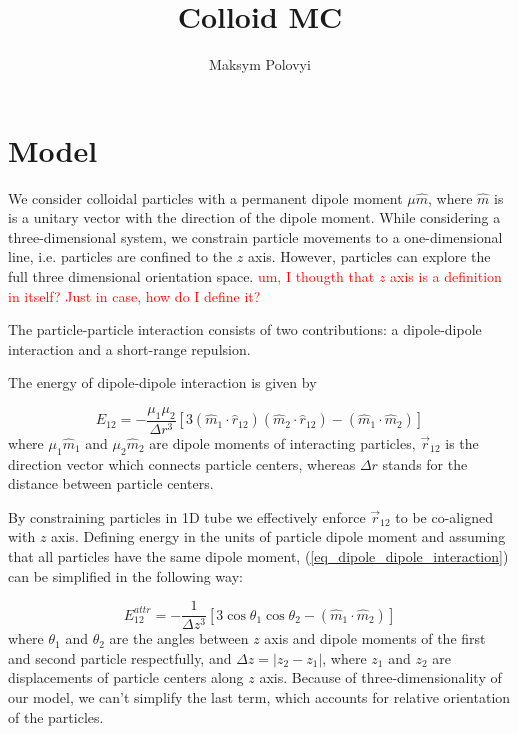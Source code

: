 \documentclass[12pt,a4paper]{article}
\author{Maksym Polovyi}
\title{Colloid MC}
\begin{document}
\section{Model}

We consider colloidal particles with a permanent dipole moment $\mu \hat{m}$, where $\hat{m}$ is is a unitary vector with the direction of the dipole moment. While considering a three-dimensional system, we constrain particle movements to a one-dimensional line, i.e. particles are confined to the $z$ axis. However, particles can explore the full three dimensional orientation space. \textcolor{red}{um, I thougth that $z$ axis is a definition in itself? Just in case, how do I define it?}

The particle-particle interaction consists of two contributions: a dipole-dipole interaction and a short-range repulsion.

The energy of dipole-dipole interaction is given by

\label{eq_dipole_dipole_interaction}
\begin{equation}
E_{12} = - \frac{\mu_1 \mu_2}{\Delta r^3}[3 (\hat{m}_1 \cdot \hat{r}_{12})(\hat{m}_2 \cdot \hat{r}_{12}) - (\hat{m}_1 \cdot \hat{m}_2)]
\end{equation}
where $\mu_1 \hat{m}_1$ and $\mu_2 \hat{m}_2$ are dipole moments of interacting particles, $\vec{r}_{12}$ is the direction vector which connects particle centers, whereas $\Delta r$ stands for the distance between particle centers.

By constraining particles in 1D tube we effectively enforce $\vec{r}_{12}$ to be co-aligned with $z$ axis. Defining energy in the units of particle dipole moment and assuming that all particles have the same dipole moment, (\ref{eq_dipole_dipole_interaction}) can be simplified in the following way:

\label{eq_dipole_dipole_1D}
\begin{equation}
E_{12}^{attr} = - \frac{1}{\Delta z^3} [3 \cos \theta_1 \cos \theta_2 - (\hat{m}_1 \cdot \hat{m}_2)]
\end{equation}
where $\theta_1$ and $\theta_2$ are the angles between $z$ axis and dipole moments of the first and second particle respectfully, and $\Delta z = |z_2 - z_1|$, where $z_1$ and $z_2$ are displacements of particle centers along $z$ axis. Because of three-dimensionality of our model, we can't simplify the last term, which accounts for relative orientation of the particles.
\end{document}
